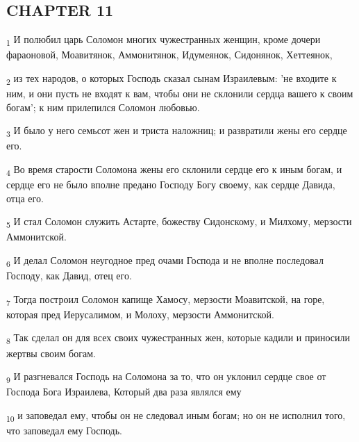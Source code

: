 \subsection{CHAPTER 11}
\begin{tcolorbox}
\textsubscript{1} И полюбил царь Соломон многих чужестранных женщин, кроме дочери фараоновой, Моавитянок, Аммонитянок, Идумеянок, Сидонянок, Хеттеянок,
\end{tcolorbox}
\begin{tcolorbox}
\textsubscript{2} из тех народов, о которых Господь сказал сынам Израилевым: 'не входите к ним, и они пусть не входят к вам, чтобы они не склонили сердца вашего к своим богам'; к ним прилепился Соломон любовью.
\end{tcolorbox}
\begin{tcolorbox}
\textsubscript{3} И было у него семьсот жен и триста наложниц; и развратили жены его сердце его.
\end{tcolorbox}
\begin{tcolorbox}
\textsubscript{4} Во время старости Соломона жены его склонили сердце его к иным богам, и сердце его не было вполне предано Господу Богу своему, как сердце Давида, отца его.
\end{tcolorbox}
\begin{tcolorbox}
\textsubscript{5} И стал Соломон служить Астарте, божеству Сидонскому, и Милхому, мерзости Аммонитской.
\end{tcolorbox}
\begin{tcolorbox}
\textsubscript{6} И делал Соломон неугодное пред очами Господа и не вполне последовал Господу, как Давид, отец его.
\end{tcolorbox}
\begin{tcolorbox}
\textsubscript{7} Тогда построил Соломон капище Хамосу, мерзости Моавитской, на горе, которая пред Иерусалимом, и Молоху, мерзости Аммонитской.
\end{tcolorbox}
\begin{tcolorbox}
\textsubscript{8} Так сделал он для всех своих чужестранных жен, которые кадили и приносили жертвы своим богам.
\end{tcolorbox}
\begin{tcolorbox}
\textsubscript{9} И разгневался Господь на Соломона за то, что он уклонил сердце свое от Господа Бога Израилева, Который два раза являлся ему
\end{tcolorbox}
\begin{tcolorbox}
\textsubscript{10} и заповедал ему, чтобы он не следовал иным богам; но он не исполнил того, что заповедал ему Господь.
\end{tcolorbox}
